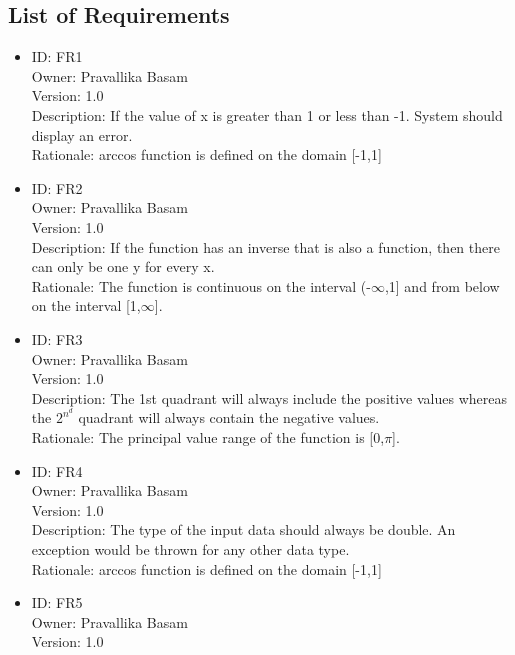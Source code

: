 \documentclass{article}
\begin{document}
    \subsection*{List of Requirements}
    \begin{itemize}
        \item ID: FR1\\
        Owner: Pravallika Basam\\
        Version: 1.0\\
        Description: If the value of x is greater than 1 or less than -1. System should display an error. \\
        Rationale: arccos function is defined on the domain [-1,1] \\
        \item ID: FR2\\
        Owner: Pravallika Basam\\
        Version: 1.0\\
        Description: If the function has an inverse that is also a function, then there can only be one y for every x.\\
        Rationale: The function is continuous on the interval (-$\infty$,1] and from below on the interval [1,$\infty$].\\
        \item ID: FR3\\
        Owner: Pravallika Basam\\
        Version: 1.0\\
        Description: The 1st quadrant will always include the positive values whereas the {$2^n^d$} quadrant will always contain the negative values.\\
        Rationale: The principal value range of the function is [0,$\pi$].\\
        \item ID: FR4\\
        Owner: Pravallika Basam\\
        Version: 1.0\\
        Description: The type of the input data should always be double. An exception would be thrown for any other data type.\\
        Rationale:  arccos function is defined on the domain [-1,1]\\
        \item ID: FR5\\
        Owner: Pravallika Basam\\
        Version: 1.0\\

\end{itemize}
\end{document}
